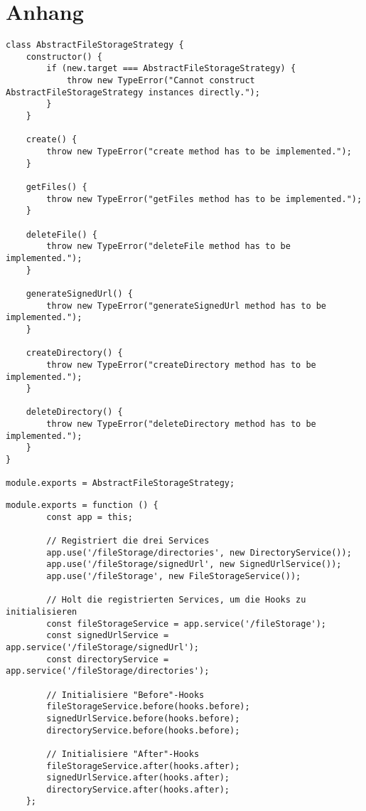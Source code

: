 \appendix
\section{Anhang}
\label{sec:appendix}

\begin{lstlisting}[caption=Abstract file storage strategy, label=code:strategyinterface]
class AbstractFileStorageStrategy {
	constructor() {
		if (new.target === AbstractFileStorageStrategy) {
			throw new TypeError("Cannot construct AbstractFileStorageStrategy instances directly.");
		}
	}
	
	create() {
		throw new TypeError("create method has to be implemented.");
	}
	
	getFiles() {
		throw new TypeError("getFiles method has to be implemented.");
	}
	
	deleteFile() {
		throw new TypeError("deleteFile method has to be implemented.");
	}
	
	generateSignedUrl() {
		throw new TypeError("generateSignedUrl method has to be implemented.");
	}
	
	createDirectory() {
		throw new TypeError("createDirectory method has to be implemented.");
	}
	
	deleteDirectory() {
		throw new TypeError("deleteDirectory method has to be implemented.");
	}
}

module.exports = AbstractFileStorageStrategy;
\end{lstlisting}

\begin{lstlisting}[caption=Registrieren des FileStorage Services, label=code:filestorageindex]
	module.exports = function () {
		const app = this;
		
		// Registriert die drei Services
		app.use('/fileStorage/directories', new DirectoryService());
		app.use('/fileStorage/signedUrl', new SignedUrlService());
		app.use('/fileStorage', new FileStorageService());
		
		// Holt die registrierten Services, um die Hooks zu initialisieren
		const fileStorageService = app.service('/fileStorage');
		const signedUrlService = app.service('/fileStorage/signedUrl');
		const directoryService = app.service('/fileStorage/directories');
		
		// Initialisiere "Before"-Hooks
		fileStorageService.before(hooks.before);
		signedUrlService.before(hooks.before);
		directoryService.before(hooks.before);
		
		// Initialisiere "After"-Hooks
		fileStorageService.after(hooks.after);
		signedUrlService.after(hooks.after);
		directoryService.after(hooks.after);
	};
\end{lstlisting}


